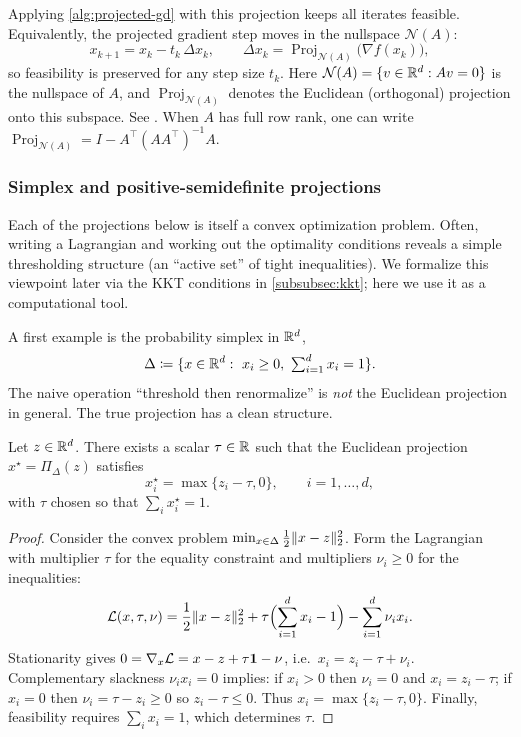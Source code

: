 Applying \cref{alg:projected-gd} with this projection keeps all iterates feasible.
Equivalently, the projected gradient step moves in the nullspace $\mathcal{N}(A)$:
\[
  x_{k+1} = x_k - t_k\,\Delta x_k,
  \qquad
  \Delta x_k = \operatorname{Proj}_{\mathcal{N}(A)}\bigl(\nabla f(x_k)\bigr),
\]
so feasibility is preserved for any step size $t_k$.
Here $\mathcal{N}(A)=\{v\in\mathbb{R}^d:Av=0\}$ is the nullspace of $A$, and $\operatorname{Proj}_{\mathcal{N}(A)}$ denotes the Euclidean (orthogonal) projection onto this subspace.
See \citet[\S10.2, Ex.~10.2]{boyd_vandenberghe_2004_convex}.
When $A$ has full row rank, one can write $\operatorname{Proj}_{\mathcal{N}(A)} = I - A^\top(AA^\top)^{-1}A$.

\subsubsection{Simplex and positive-semidefinite projections}
\label{subsubsec:projection-examples}

Each of the projections below is itself a convex optimization problem.
Often, writing a Lagrangian and working out the optimality conditions reveals a simple thresholding structure (an ``active set'' of tight inequalities).
We formalize this viewpoint later via the KKT conditions in \cref{subsubsec:kkt}; here we use it as a computational tool.

A first example is the probability simplex in $\mathbb{R}^d$,
\[
  \Delta \coloneqq \{x\in\mathbb{R}^d:\ x_i\ge 0,\ \textstyle\sum_{i=1}^d x_i = 1\}.
\]
The naive operation ``threshold then renormalize'' is \emph{not} the Euclidean projection in general.
The true projection has a clean structure.

\begin{proposition}
\label{prop:simplex-threshold}
Let $z\in\mathbb{R}^d$.
There exists a scalar $\tau\in\mathbb{R}$ such that the Euclidean projection $x^\star=\Pi_\Delta(z)$ satisfies
\begin{equation}
  x^\star_i = \max\{z_i-\tau,0\},
  \qquad i=1,\dots,d,
  \label{eq:simplex-proj-threshold}
\end{equation}
with $\tau$ chosen so that $\sum_i x^\star_i = 1$.
\end{proposition}
\begin{proof}
Consider the convex problem $\min_{x\in\Delta} \frac12\lVert x-z\rVert_2^2$.
Form the Lagrangian with multiplier $\tau$ for the equality constraint and multipliers $\nu_i\ge 0$ for the inequalities:
\[
  \mathcal{L}(x,\tau,\nu)
  = \frac12\lVert x-z\rVert_2^2 + \tau\Bigl(\sum_{i=1}^d x_i - 1\Bigr) - \sum_{i=1}^d \nu_i x_i.
\]
Stationarity gives $0 = \nabla_x \mathcal{L} = x-z + \tau \mathbf{1} - \nu$, i.e.\ $x_i = z_i-\tau+\nu_i$.
Complementary slackness $\nu_i x_i = 0$ implies:
if $x_i>0$ then $\nu_i=0$ and $x_i=z_i-\tau$; if $x_i=0$ then $\nu_i=\tau-z_i\ge 0$ so $z_i-\tau\le 0$.
Thus $x_i=\max\{z_i-\tau,0\}$.
Finally, feasibility requires $\sum_i x_i=1$, which determines $\tau$.
\end{proof}

